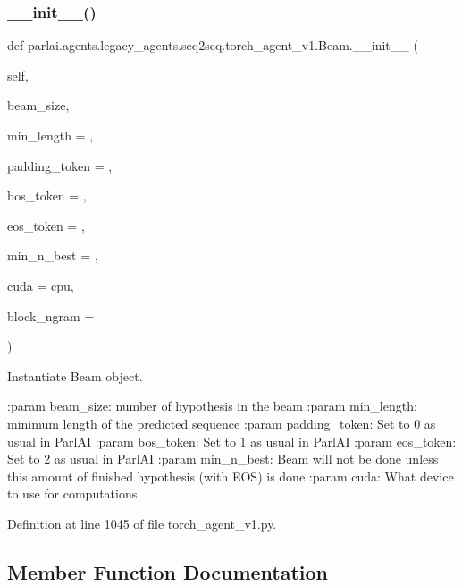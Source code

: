 \subsubsection{\texorpdfstring{\+\_\+\+\_\+init\+\_\+\+\_\+()}{\_\_init\_\_()}}
{\footnotesize\ttfamily def parlai.\+agents.\+legacy\+\_\+agents.\+seq2seq.\+torch\+\_\+agent\+\_\+v1.\+Beam.\+\_\+\+\_\+init\+\_\+\+\_\+ (\begin{DoxyParamCaption}\item[{}]{self,  }\item[{}]{beam\+\_\+size,  }\item[{}]{min\+\_\+length = {},  }\item[{}]{padding\+\_\+token = {},  }\item[{}]{bos\+\_\+token = {},  }\item[{}]{eos\+\_\+token = {},  }\item[{}]{min\+\_\+n\+\_\+best = {},  }\item[{}]{cuda = {\ttfamily \textquotesingle{}cpu\textquotesingle{}},  }\item[{}]{block\+\_\+ngram = {} }\end{DoxyParamCaption})}

\begin{DoxyVerb}Instantiate Beam object.

:param beam_size: number of hypothesis in the beam
:param min_length: minimum length of the predicted sequence
:param padding_token: Set to 0 as usual in ParlAI
:param bos_token: Set to 1 as usual in ParlAI
:param eos_token: Set to 2 as usual in ParlAI
:param min_n_best: Beam will not be done unless this amount of finished
           hypothesis (with EOS) is done
:param cuda: What device to use for computations
\end{DoxyVerb}
 

Definition at line 1045 of file torch\+\_\+agent\+\_\+v1.\+py.



\subsection{Member Function Documentation}
\mbox{\label{classparlai_1_1agents_1_1legacy__agents_1_1seq2seq_1_1torch__agent__v1_1_1Beam_a6c6cf89b73830b99bba0420c720c50d8}} 
